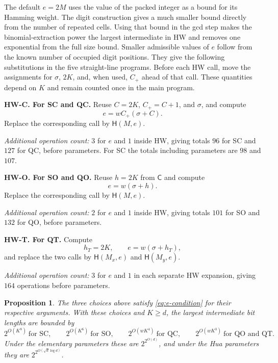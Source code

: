 \documentclass[11pt]{article}
\newtheorem{proposition}[theorem]{Proposition}
\theoremstyle{remark}
\newcommand{\Coord}{\mathsf{C}}
\begin{document}
The default $e=2M$ uses the value of the packed integer as a bound for
its Hamming weight. The digit construction gives a much smaller bound
directly from the number of repeated cells. Using that bound in the gcd
step makes the binomial-extraction power the largest intermediate in HW
and removes one exponential from the full size bound.
Smaller admissible values of $e$ follow from the known number of
occupied digit positions. They give the following substitutions in the
five straight-line programs. Before each HW call, move the assignments
for $\sigma$, $2K$, and, when used, $C_+$ ahead of that call.
These quantities depend on $K$ and remain counted once in the main
program.

\textbf{HW-C. For SC and QC.} Reuse $C=2K$, $C_+=C+1$, and
$\sigma$, and compute
\[
  e=wC_+(\sigma+C).
\]
Replace the corresponding call by $\mathsf H(M,e)$.

\emph{Additional operation count:} $3$ for $e$ and $1$ inside HW,
giving totals $96$ for SC and $127$ for QC, before parameters.
For SC the totals including parameters are $98$ and $107$.

\textbf{HW-O. For SO and QO.} Reuse $h=2K$ from $\Coord$ and
compute
\[
  e=w(\sigma+h).
\]
Replace the corresponding call by $\mathsf H(M,e)$.

\emph{Additional operation count:} $2$ for $e$ and $1$ inside HW,
giving totals $101$ for SO and $132$ for QO, before parameters.

\textbf{HW-T. For QT.} Compute
\[
  h_T=2K,\qquad e=w(\sigma+h_T),
\]
and replace the two calls by $\mathsf H(M_x,e)$ and $\mathsf H(M_y,e)$.

\emph{Additional operation count:} $3$ for $e$ and $1$ in each
separate HW expansion, giving $164$ operations before parameters.

\begin{proposition}\label{prop:expanded-size}
The three choices above satisfy \eqref{eq:e-condition} for their
respective arguments. With these choices and $K\ge d$, the largest
intermediate bit lengths are bounded by
\[
  2^{O(K^8)}\ \text{for SC},\qquad
  2^{O(K^6)}\ \text{for SO},\qquad
  2^{O(wK^4)}\ \text{for QC},\qquad
  2^{O(wK^3)}\ \text{for QO and QT}.
\]
Under the elementary parameters these are $2^{2^{O(d)}}$, and
under the Hua parameters they are $2^{2^{O(\sqrt d\log d)}}$.
\end{proposition}
\end{document}
